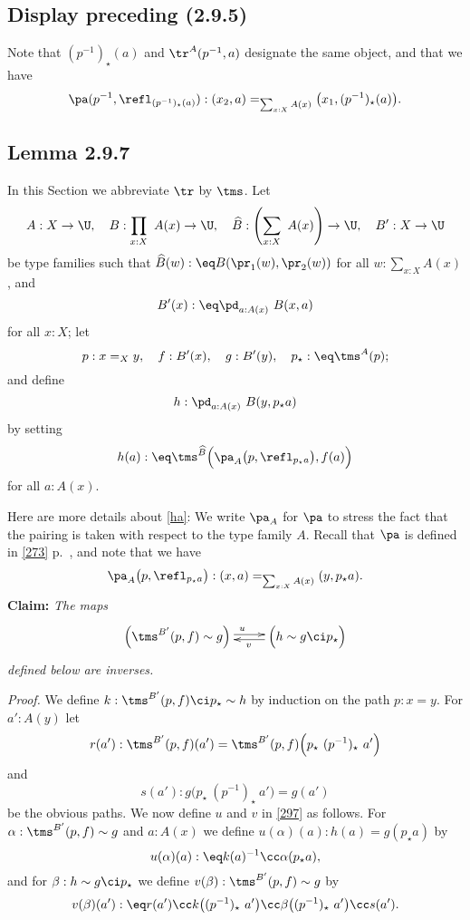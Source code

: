 \documentclass[12pt]{article}
\begin{document}

\subsection{Display preceding (2.9.5)}

Note that $(p^{-1})_\star(a)$ and $\tr^A(p^{-1},a)$ designate the same object, and that we have 
$$
\pa(p^{-1},\refl_{(p^{-1})_\star(a)}):(x_2,a)=_{\sum_{x:X}A(x)}\big(x_1,(p^{-1})_\star(a)\big).
$$ 


\subsection{Lemma 2.9.7}


In this Section we abbreviate $\tr$ by $\tms$. Let 
$$
A:X\to\U,\quad B:\prod_{x:X}\ A(x)\to\U,\quad\widehat B:\left(\sum_{x:X}\ A(x)\right)\to\U,\quad B':X\to\U
$$ 
be type families such that $\widehat B(w):\eq B(\pr_1(w),\pr_2(w))$ for all $w:\sum_{x:X}A(x)$, and 
$$
B'(x):\eq\pd_{a:A(x)}\ B(x,a)
$$ 
for all $x:X$; let 
$$
p:x=_Xy,\quad f:B'(x),\quad g:B'(y),\quad p_\star:\eq\tms^A(p);
$$ 
and define 
$$
h:\pd_{a:A(x)}\ B(y,p_\star a)
$$ 
by setting 
\begin{equation}\label{ha}
h(a):\eq\tms^{\widehat B}\Big(\pa_A\big(p,\refl_{p_\star a}\big),f(a)\Big)
\end{equation}
for all $a:A(x)$. 

Here are more details about \eqref{ha}: We write $\pa_A$ for $\pa$ to stress the fact that the pairing is taken with respect to the type family $A$. Recall that $\pa$ is defined in \eqref{273} p.~\pageref{273}, and note that we have 
$$
\pa_A\big(p,\refl_{p_\star a}\big):(x,a)=_{\sum_{x:X}A(x)}(y,p_\star a).
$$
\textbf{Claim:} \emph{The maps}
\begin{equation}\label{297}
\xymatrix{
\Big(\tms^{B'}(p,f)\sim g\Big)\ar@<2pt>[r]^(.5)u&\Big(h\sim g\ci p_\star\Big)\ar@<2pt>[l]^(.45)v}
\end{equation}
\emph{defined below are inverses.}

\nn\emph{Proof.} We define $k:\tms^{B'}(p,f)\ci p_\star\sim h$ by induction on the path $p:x=y$. For $a':A(y)$ let 
$$
r(a'):\tms^{B'}(p,f)(a')=\tms^{B'}(p,f)\Big(p_\star\ (p^{-1})_\star\ a'\Big)
$$ 
and 
$$
s(a'):g\Big(p_\star\ (p^{-1})_\star\ a'\Big)=g(a')
$$ 
be the obvious paths. We now define $u$ and $v$ in \eqref{297} as follows. For $\alpha:\tms^{B'}(p,f)\sim g$ and $a:A(x)$ we define $u(\alpha)(a):h(a)=g(p_\star a)$ by 
$$ 
u(\alpha)(a):\eq k(a)^{-1}\cc\alpha(p_\star a), 
$$ 
and for $\beta:h\sim g\ci p_\star$ we define $v(\beta):\tms^{B'}(p,f)\sim g$ by 
$$
v(\beta)(a'):\eq r(a')\cc k\big((p^{-1})_\star\ a'\big)\cc\beta\big((p^{-1})_\star\ a'\big)\cc s(a').
$$ 
\end{document}
